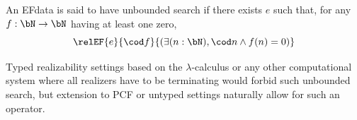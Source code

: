 

\begin{definition}
  An EFdata is said to have unbounded search if there exists $e$ such that, for any $f : \bN \to \bN$ having at least one zero,
  \[\relEF{e}{\cod f}{(\exists (n : \bN), \cod n \land f(n) = 0)}\]
\end{definition}
\begin{example}
Typed realizability settings based on the $\lambda$-calculus or any other computational system where all realizers have to be
terminating would forbid such unbounded search,
but extension to PCF or untyped settings naturally allow for such an operator.
\end{example}


